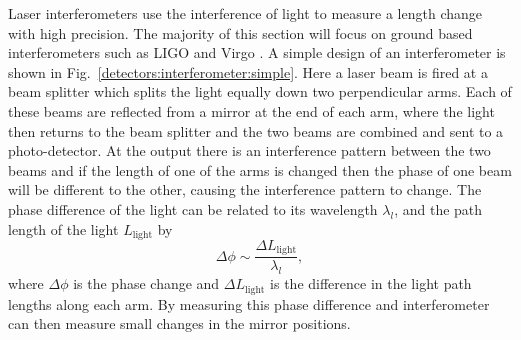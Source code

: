 Laser interferometers use the interference of light to measure a
length change with high precision.  The majority of this
section will focus on ground based interferometers such as \gls{LIGO} and Virgo
\citep{aasi2015AdvancedLIGO,acernese2015AdvancedVirgo}.  A simple design of an
interferometer is shown in
Fig.~\ref{detectors:interferometer:simple}. Here a laser
beam is fired at a beam splitter which splits the light equally down two
perpendicular arms.  Each of these beams are reflected from a mirror at the end
of each arm, where the light then returns to the beam splitter and the two beams
are combined and sent to a photo-detector.  At the output there is an
interference pattern between the two beams and if the length of one of the arms
is changed then the phase of one beam will be different to the other, causing the interference pattern to change.  The phase difference of the light can be
related to its wavelength $\lambda_l$, and the path length of the light $L_{\text{light}}$ by
%
\begin{equation}
\label{intro:detectors:phasechange}
\Delta \phi \sim \frac{\Delta L_{\text{light}}}{\lambda_l},
\end{equation}
%
where $\Delta \phi$ is the phase change and $\Delta L_{\text{light}}$ is the difference in the
light path lengths along each arm.  By measuring this phase difference and interferometer can then
measure small changes in the mirror positions.

